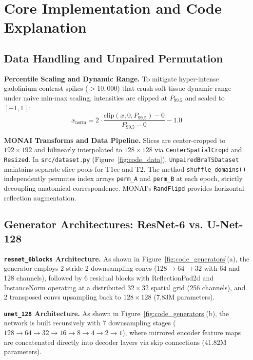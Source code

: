 \documentclass[10pt,twocolumn,letterpaper]{article}
\begin{document}
\section{Core Implementation and Code Explanation}

\subsection{Data Handling and Unpaired Permutation}
\textbf{Percentile Scaling and Dynamic Range.} To mitigate hyper-intense gadolinium contrast spikes ($>10,000$) that crush soft tissue dynamic range under naive min-max scaling, intensities are clipped at $P_{99.5}$ and scaled to $[-1, 1]$:
\begin{equation}
x_{\text{norm}} = 2 \cdot \frac{\text{clip}(x, 0, P_{99.5}) - 0}{P_{99.5} - 0} - 1.0
\end{equation}

\textbf{MONAI Transforms and Data Pipeline.} Slices are center-cropped to $192 \times 192$ and bilinearly interpolated to $128 \times 128$ via \texttt{CenterSpatialCropd} and \texttt{Resized}. In \texttt{src/dataset.py} (Figure~\ref{fig:code_data}), \texttt{UnpairedBraTSDataset} maintains separate slice pools for T1ce and T2. The method \texttt{shuffle\_domains()} independently permutes index arrays \texttt{perm\_A} and \texttt{perm\_B} at each epoch, strictly decoupling anatomical correspondence. MONAI's \texttt{RandFlipd} provides horizontal reflection augmentation.

\subsection{Generator Architectures: ResNet-6 vs. U-Net-128}
\textbf{\texttt{resnet\_6blocks} Architecture.} As shown in Figure~\ref{fig:code_generators}(a), the generator employs 2 stride-2 downsampling convs ($128 \to 64 \to 32$ with 64 and 128 channels), followed by 6 residual blocks with ReflectionPad2d and InstanceNorm operating at a distributed $32 \times 32$ spatial grid (256 channels), and 2 transposed convs upsampling back to $128 \times 128$ (7.83M parameters).

\textbf{\texttt{unet\_128} Architecture.} As shown in Figure~\ref{fig:code_generators}(b), the network is built recursively with 7 downsampling stages ($128 \to 64 \to 32 \to 16 \to 8 \to 4 \to 2 \to 1$), where mirrored encoder feature maps are concatenated directly into decoder layers via skip connections (41.82M parameters).
\end{document}
